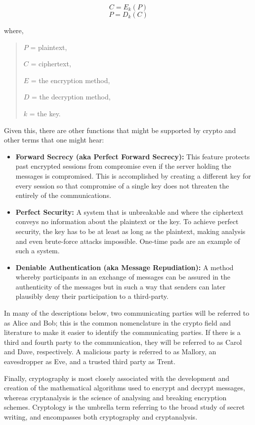 \documentclass[british]{article}
\begin{document}
$$ C = E_k(P) $$
$$ P = D_k(C) $$

where, 
\begin{verse}
$P$ = plaintext,

$C$ = ciphertext,

$E$ = the encryption method,

$D$ = the decryption method,

$k$ = the key.
\end{verse}
Given this, there are other functions that might be supported by crypto
and other terms that one might hear:
\begin{itemize}
\item \textbf{Forward Secrecy (aka Perfect Forward Secrecy):} This feature
protects past encrypted sessions from compromise even if the server
holding the messages is compromised. This is accomplished by creating
a different key for every session so that compromise of a single key
does not threaten the entirely of the communications. 
\item \textbf{Perfect Security: }A system that is unbreakable and where
the ciphertext conveys no information about the plaintext or the key.
To achieve perfect security, the key has to be at least as long as
the plaintext, making analysis and even brute-force attacks impossible.
One-time pads are an example of such a system.
\item \textbf{Deniable Authentication (aka Message Repudiation): }A method
whereby participants in an exchange of messages can be assured in
the authenticity of the messages but in such a way that senders can
later plausibly deny their participation to a third-party.
\end{itemize}
In many of the descriptions below, two communicating parties will
be referred to as Alice and Bob; this is the common nomenclature in
the crypto field and literature to make it easier to identify the
communicating parties. If there is a third and fourth party to the
communication, they will be referred to as Carol and Dave, respectively.
A malicious party is referred to as Mallory, an eavesdropper as Eve,
and a trusted third party as Trent.

Finally, cryptography is most closely associated with the development
and creation of the mathematical algorithms used to encrypt and decrypt
messages, whereas cryptanalysis is the science of analysing and breaking
encryption schemes. Cryptology is the umbrella term referring to the
broad study of secret writing, and encompasses both cryptography and
cryptanalysis.
\end{document}
